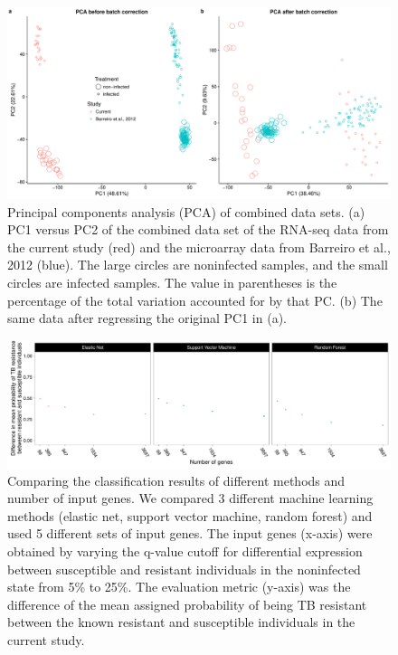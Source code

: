 \documentclass[fleqn,10pt]{wlscirep}
\begin{document}
\begin{figure}[ht]
\centering
\includegraphics[width=\linewidth]{../figure/combined-pca.pdf}
\caption{
Principal components analysis (PCA) of combined data sets. (a) PC1
versus PC2 of the combined data set of the RNA-seq data from the
current study (red) and the microarray data from Barreiro et al., 2012
\cite{Barreiro2012} (blue). The large circles are noninfected samples,
and the small circles are infected samples. The value in parentheses
is the percentage of the total variation accounted for by that PC. (b)
The same data after regressing the original PC1 in (a).
}
\label{fig:combined-pca}
\end{figure}

\begin{figure}[ht]
\centering
\includegraphics[width=\linewidth]{../figure/classifier-compare.pdf}
\caption{
Comparing the classification results of different methods and number
of input genes. We compared 3 different machine learning methods
(elastic net, support vector machine, random forest) and used 5
different sets of input genes. The input genes (x-axis) were obtained
by varying the q-value cutoff for differential expression between
susceptible and resistant individuals in the noninfected state from
5\% to 25\%. The evaluation metric (y-axis) was the difference of the
mean assigned probability of being TB resistant between the known
resistant and susceptible individuals in the current study.
}
\label{fig:class-compare}
\end{figure}
\end{document}
